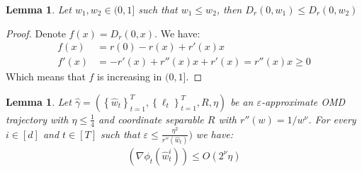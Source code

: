 \documentclass[10pt]{article}
\newtheorem{lemma}[theorem]{Lemma}
\theoremstyle{definition}
\theoremstyle{remark}
\renewcommand{\epsilon}{\varepsilon}
\newcommand{\curly}[1]{ {\left\{ #1 \right\}}}
\newcommand{\roundy}[1]{ {\left( #1 \right)}}
\newcommand{\barconst}{\nu}
\begin{document}
\begin{lemma} \label{lem:bregman monotonic}
Let $w_1,w_2\in(0,1]$ such that $w_1 \le w_2$, then $D_r(0, w_1) \le D_r(0, w_2)$
\end{lemma}
\begin{proof}
Denote $f(x) = D_r(0, x)$. We have:
\begin{align*}
    f(x) &= r(0) - r(x) + r'(x)x \\
    f'(x) &= -r'(x) + r''(x)x + r'(x) = r''(x)x \ge 0
\end{align*}
Which means that $f$ is increasing in $(0, 1]$.
\end{proof}

\begin{lemma}\label{lem:not_too_far_phi}
Let $\hat{\gamma}=(\curly{\hat{w}_t}_{t=1}^T, \curly{\ell_t}_{t=1}^T, R, \eta)$ be an $\epsilon$-approximate OMD trajectory with $\eta \le \frac{1}{4}$ and coordinate separable $R$ with $r''(w) = 1/w^\barconst$. For every $i\in[d]$ and $t\in[T]$ such that $\epsilon \le \frac{\eta^2}{r''(\hat{w}_t)})$ we have:
\begin{align*}
    (\nabla\phi_t(\hat{w}_t^i)) \le O\roundy{2^\barconst\eta} 
\end{align*}
\end{lemma}
\end{document}
